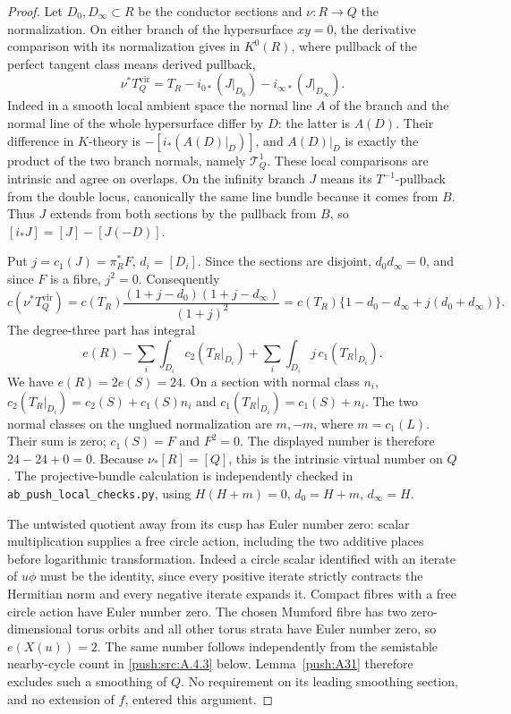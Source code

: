 \begin{proof}
Let $D_0,D_\infty\subset R$ be the conductor sections and
$\nu:R\to Q$ the normalization. On either branch of the
hypersurface $xy=0$, the derivative comparison with its
normalization gives in $K^0(R)$, where pullback of the
perfect tangent class means derived pullback,
\[
 \nu^*T_Q^{\mathrm{vir}}
 =T_R-i_{0*}(J|_{D_0})-i_{\infty*}(J|_{D_\infty}).
\]
Indeed in a smooth local ambient space the normal line $A$ of
the branch and the normal line of the whole hypersurface
differ by $D$: the latter is $A(D)$. Their difference in
$K$-theory is $-[i_*(A(D)|_D)]$, and $A(D)|_D$ is exactly
the product of the two branch normals, namely $\mathcal T^1_Q$.
These local comparisons are intrinsic and agree on overlaps.
On the infinity branch $J$ means its $T^{-1}$-pullback
from the double locus, canonically the same line bundle
because it comes from $B$. Thus $J$ extends from both sections by the pullback from $B$,
so $[i_*J]=[J]-[J(-D)]$.

Put $j=c_1(J)=\pi_R^*F$, $d_i=[D_i]$. Since the sections are
disjoint, $d_0d_\infty=0$, and since $F$ is a fibre, $j^2=0$.
Consequently
\[
 c(\nu^*T_Q^{\mathrm{vir}})
 =c(T_R)\frac{(1+j-d_0)(1+j-d_\infty)}{(1+j)^2}
 =c(T_R)\{1-d_0-d_\infty+j(d_0+d_\infty)\}.
\]
The degree-three part has integral
\[
 e(R)-\sum_i\int_{D_i}c_2(T_R|_{D_i})
       +\sum_i\int_{D_i}j\,c_1(T_R|_{D_i}).
\]
We have $e(R)=2e(S)=24$. On a section with normal class
$n_i$, $c_2(T_R|_{D_i})=c_2(S)+c_1(S)n_i$ and
$c_1(T_R|_{D_i})=c_1(S)+n_i$. The two normal classes on
the unglued normalization are $m,-m$, where $m=c_1(L)$.
Their sum is zero; $c_1(S)=F$ and $F^2=0$. The displayed
number is therefore $24-24+0=0$. Because
$\nu_*[R]=[Q]$, this is the intrinsic virtual number on $Q$.
The projective-bundle calculation is independently checked
in \texttt{ab\_push\_local\_checks.py}, using
$H(H+m)=0$, $d_0=H+m$, $d_\infty=H$.

The untwisted quotient away from its cusp has Euler number zero:
scalar multiplication supplies a free circle action, including
the two additive places before logarithmic transformation. Indeed
a circle scalar identified with an iterate of $u\phi$ must be
the identity, since every positive iterate strictly contracts
the Hermitian norm and every negative iterate expands it.
Compact fibres with a free circle action have Euler number zero.
The chosen Mumford fibre has two zero-dimensional torus orbits
and all other torus strata have Euler number zero, so
$e(X(u))=2$. The same number follows independently from the
semistable nearby-cycle count in \ref{push:src:A.4.3} below. Lemma~\ref{push:A31}
therefore excludes such a smoothing of $Q$. No requirement
on its leading smoothing section, and no extension of $f$,
entered this argument.


\end{proof}
